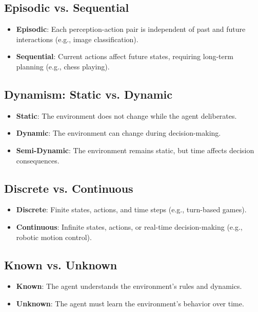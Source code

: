 \documentclass[conference]{IEEEtran}
\begin{document}
\subsection{Episodic vs. Sequential}
\begin{itemize}
    \item \textbf{Episodic}: Each perception-action pair is independent of past and future interactions (e.g., image classification).
    \item \textbf{Sequential}: Current actions affect future states, requiring long-term planning (e.g., chess playing).
\end{itemize}

\subsection{Dynamism: Static vs. Dynamic}
\begin{itemize}
    \item \textbf{Static}: The environment does not change while the agent deliberates.
    \item \textbf{Dynamic}: The environment can change during decision-making.
    \item \textbf{Semi-Dynamic}: The environment remains static, but time affects decision consequences.
\end{itemize}

\subsection{Discrete vs. Continuous}
\begin{itemize}
    \item \textbf{Discrete}: Finite states, actions, and time steps (e.g., turn-based games).
    \item \textbf{Continuous}: Infinite states, actions, or real-time decision-making (e.g., robotic motion control).
\end{itemize}

\subsection{Known vs. Unknown}
\begin{itemize}
    \item \textbf{Known}: The agent understands the environment’s rules and dynamics.
    \item \textbf{Unknown}: The agent must learn the environment’s behavior over time.
\end{itemize}
\end{document}
